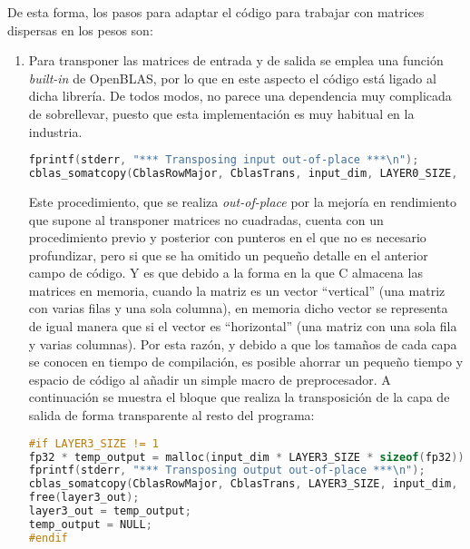 De esta forma, los pasos para adaptar el código para trabajar con matrices dispersas en los pesos son:

\begin{enumerate}
    \item Para transponer las matrices de entrada y de salida se emplea una función \textit{built-in} de OpenBLAS, por lo que en este aspecto el código está ligado al dicha librería. De todos modos, no parece una dependencia muy complicada de sobrellevar, puesto que esta implementación es muy habitual en la industria.\medskip
\begin{lstlisting}[language=C]
fprintf(stderr, "*** Transposing input out-of-place ***\n");
cblas_somatcopy(CblasRowMajor, CblasTrans, input_dim, LAYER0_SIZE, 1.f, (float *) input, LAYER0_SIZE, (float *) temp_input, input_dim);
\end{lstlisting}

    Este procedimiento, que se realiza \textit{out-of-place} por la mejoría en rendimiento que supone al transponer matrices no cuadradas, cuenta con un procedimiento previo y posterior con punteros en el que no es necesario profundizar, pero si que se ha omitido un pequeño detalle en el anterior campo de código. Y es que debido a la forma en la que C almacena las matrices en memoria, cuando la matriz es un vector ``vertical'' (una matriz con varias filas y una sola columna), en memoria dicho vector se representa de igual manera que si el vector es ``horizontal'' (una matriz con una sola fila y varias columnas). Por esta razón, y debido a que los tamaños de cada capa se conocen en tiempo de compilación, es posible ahorrar un pequeño tiempo y espacio de código al añadir un simple macro de preprocesador. A continuación se muestra el bloque que realiza la transposición de la capa de salida de forma transparente al resto del programa:\medskip
\begin{lstlisting}[language=C]
#if LAYER3_SIZE != 1
fp32 * temp_output = malloc(input_dim * LAYER3_SIZE * sizeof(fp32));
fprintf(stderr, "*** Transposing output out-of-place ***\n");
cblas_somatcopy(CblasRowMajor, CblasTrans, LAYER3_SIZE, input_dim, 1.f, (float *) layer3_out, input_dim, (float *) temp_output, LAYER3_SIZE);
free(layer3_out);
layer3_out = temp_output;
temp_output = NULL;
#endif
\end{lstlisting}


\end{enumerate}

